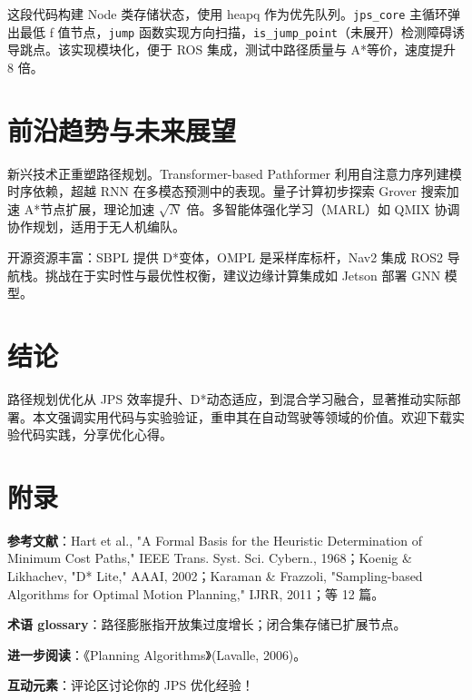 这段代码构建 Node 类存储状态，使用 heapq 作为优先队列。\texttt{jps\_{}core} 主循环弹出最低 f 值节点，\texttt{jump} 函数实现方向扫描，\texttt{is\_{}jump\_{}point}（未展开）检测障碍诱导跳点。该实现模块化，便于 ROS 集成，测试中路径质量与 A*等价，速度提升 8 倍。\par
\chapter{前沿趋势与未来展望}
新兴技术正重塑路径规划。Transformer-based Pathformer 利用自注意力序列建模时序依赖，超越 RNN 在多模态预测中的表现。量子计算初步探索 Grover 搜索加速 A*节点扩展，理论加速 $\sqrt{N}$ 倍。多智能体强化学习（MARL）如 QMIX 协调协作规划，适用于无人机编队。\par
开源资源丰富：SBPL 提供 D*变体，OMPL 是采样库标杆，Nav2 集成 ROS2 导航栈。挑战在于实时性与最优性权衡，建议边缘计算集成如 Jetson 部署 GNN 模型。\par
\chapter{结论}
路径规划优化从 JPS 效率提升、D*动态适应，到混合学习融合，显著推动实际部署。本文强调实用代码与实验验证，重申其在自动驾驶等领域的价值。欢迎下载实验代码实践，分享优化心得。\par
\chapter{附录}
\textbf{参考文献}：Hart et al., "A Formal Basis for the Heuristic Determination of Minimum Cost Paths," IEEE Trans. Syst. Sci. Cybern., 1968；Koenig \&{} Likhachev, "D* Lite," AAAI, 2002；Karaman \&{} Frazzoli, "Sampling-based Algorithms for Optimal Motion Planning," IJRR, 2011；等 12 篇。\par
\textbf{术语 glossary}：路径膨胀指开放集过度增长；闭合集存储已扩展节点。\par
\textbf{进一步阅读}：《Planning Algorithms》(Lavalle, 2006)。\par
\textbf{互动元素}：评论区讨论你的 JPS 优化经验！\par

